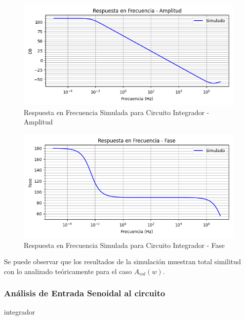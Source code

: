 \begin{figure}[H]
    \centering 
    \includegraphics [scale=1] {../Ejercicio3-CircuitoIntegradoresyDerivadores/Imagenes/simulado-integrador-amplitud.png} 
    \caption{Respuesta en Frecuencia Simulada para Circuito Integrador - Amplitud }
    \label{fig:emptyPlotTool}
\end{figure}

\begin{figure}[H]
    \centering 
    \includegraphics [scale=1] {../Ejercicio3-CircuitoIntegradoresyDerivadores/Imagenes/simulado-integrador-fase.png} 
    \caption{Respuesta en Frecuencia Simulada para Circuito Integrador - Fase }
    \label{fig:emptyPlotTool}
\end{figure}

Se puede observar que los resultados de la simulación muestran total similitud con lo analizado teóricamente para el caso $A_{vol}(w)$.

\subsubsection{Análisis de Entrada Senoidal al circuito} integrador

